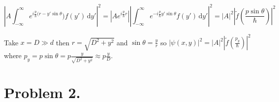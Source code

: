 \documentclass[12pt]{extarticle}
\begin{document}
\begin{enumerate}
\[ \left| A \int_{-\infty}^{\infty} e^{i \frac{p}{\hbar} (r - y' \sin{\theta}}) f(y')  \, \mathrm{d} y' \right|^2 = \left| A e^{i \frac{p}{\hbar} r} \right| \left| \int_{-\infty}^{\infty} e^{- i \frac{p}{\hbar} y' \sin{\theta}} f(y')  \, \mathrm{d} y' \right|^2 = |A|^2 \left| \tilde{f}\left(\frac{p \sin{\theta}}{\hbar}\right) \right|^2  \]

Take $x = D \gg d$ then $r = \sqrt{D^2 + y^2}$ and $\sin{\theta} = \frac{y}{r}$ so $\left| \psi(x,y) \right|^2 = |A|^2 \left| \tilde{f}\left(\frac{p_y}{\hbar}\right) \right|^2$ \\  where $p_y = p \sin{\theta} = p \frac{y}{\sqrt{D^2 + y^2}} \approx p \frac{y}{D}$.
\end{enumerate}

\section*{Problem 2.}
\end{document}
